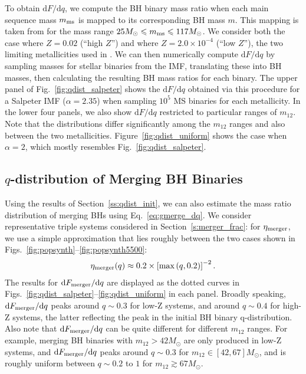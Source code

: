 \documentclass[
        fleqn,
        usenatbib,
    ]{mnras}
\newcommand*{\rdil}[2]{\mathrm{d}#1/\mathrm{d}#2}
\newcommand*{\p}[1]{\left(#1\right)}
\newcommand*{\s}[1]{\left[#1\right]}
\begin{document}
To obtain $\rdil{F}{q}$, we compute the BH binary mass ratio when each main
sequence mass $m_{\rm ms}$ is mapped to its corresponding BH mass $m$. This
mapping is taken from \citet{spera2017very} for the mass range $25M_{\odot} \leq
m_{\rm ms} \leq 117 M_{\odot}$. We consider both the case where $Z = 0.02$
(``high $Z$'') and where $Z = 2.0 \times 10^{-4}$ (``low $Z$''), the two
limiting metallicities used in \citet{spera2017very}. We can then numerically
compute $\rdil{F}{q}$ by sampling masses for stellar binaries from the IMF,
translating these into BH masses, then calculating the resulting BH mass ratios
for each binary. The upper panel of Fig.~\ref{fig:qdist_salpeter} shows the
$\rdil{F}{q}$ obtained via this procedure for a Salpeter IMF ($\alpha = 2.35$)
when sampling $10^5$ MS binaries for each metallicity. In the lower four panels,
we also show $\rdil{F}{q}$ restricted to particular ranges of $m_{12}$. Note
that the distributions differ significantly among the $m_{12}$ ranges and also
between the two metallicities. Figure~\ref{fig:qdist_uniform} shows the case
when $\alpha = 2$, which mostly resembles Fig.~\ref{fig:qdist_salpeter}.

\subsection{$q$-distribution of Merging BH Binaries}\label{ss:qdist_merge}

Using the results of Section~\ref{ss:qdist_init}, we can also estimate the mass
ratio distribution of merging BHs using Eq.~\eqref{eq:gmerge_dq}. We consider
representative triple systems considered in Section~\ref{s:merger_frac}: for
$\eta_{\rm merger}$, we use a simple approximation that lies roughly between the
two cases shown in Figs.~\ref{fig:popsynth}--\ref{fig:popsynth5500}:
\begin{align}
    \eta_{\rm merger}(q) \approx 0.2 \times \s{\max\p{q, 0.2}}^{-2}.
        \label{eq:etam_approx}
\end{align}
The results for $\rdil{F_{\rm merger}}{q}$ are displayed as the dotted curves in
Figs.~\ref{fig:qdist_salpeter}--\ref{fig:qdist_uniform} in each panel. Broadly
speaking, $\rdil{F_{\rm merger}}{q}$ peaks around $q \sim 0.3$ for low-Z
systems, and around $q\sim 0.4$ for high-Z systems, the latter reflecting the
peak in the initial BH binary q-distribution. Also note that $\rdil{F_{\rm
merger}}{q}$ can be quite different for different $m_{12}$ ranges. For example,
merging BH binaries with $m_{12} > 42M_\odot$ are only produced in low-Z
systems, and $\rdil{F_{\rm merger}}{q}$ peaks around $q\sim 0.3$ for $m_{12}\in
[42, 67]M_{\odot}$, and is roughly uniform between $q \sim 0.2$ to $1$ for
$m_{12}\gtrsim 67 M_{\odot}$.
\end{document}
